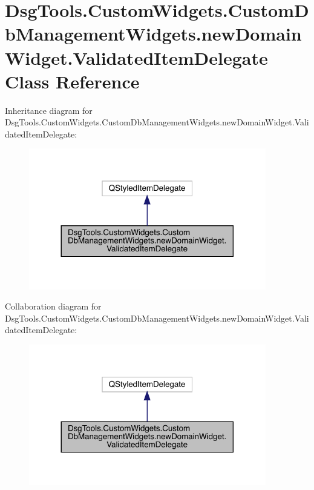 \hypertarget{class_dsg_tools_1_1_custom_widgets_1_1_custom_db_management_widgets_1_1new_domain_widget_1_1_validated_item_delegate}{}\section{Dsg\+Tools.\+Custom\+Widgets.\+Custom\+Db\+Management\+Widgets.\+new\+Domain\+Widget.\+Validated\+Item\+Delegate Class Reference}
\label{class_dsg_tools_1_1_custom_widgets_1_1_custom_db_management_widgets_1_1new_domain_widget_1_1_validated_item_delegate}


Inheritance diagram for Dsg\+Tools.\+Custom\+Widgets.\+Custom\+Db\+Management\+Widgets.\+new\+Domain\+Widget.\+Validated\+Item\+Delegate\+:
\nopagebreak
\begin{figure}[H]
\begin{center}
\leavevmode
\includegraphics[width=293pt]{class_dsg_tools_1_1_custom_widgets_1_1_custom_db_management_widgets_1_1new_domain_widget_1_1_val52f0b7dab3ad4fcf66f7be47a5f494ae}
\end{center}
\end{figure}


Collaboration diagram for Dsg\+Tools.\+Custom\+Widgets.\+Custom\+Db\+Management\+Widgets.\+new\+Domain\+Widget.\+Validated\+Item\+Delegate\+:
\nopagebreak
\begin{figure}[H]
\begin{center}
\leavevmode
\includegraphics[width=293pt]{class_dsg_tools_1_1_custom_widgets_1_1_custom_db_management_widgets_1_1new_domain_widget_1_1_val3965cde687d602c42a7871002a9cb360}
\end{center}
\end{figure}
